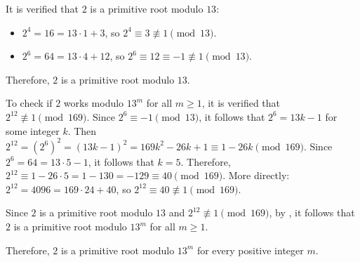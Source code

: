 \begin{enumerate}
\begin{enumerate}
\begin{subanswer}
      It is verified that $2$ is a primitive root modulo $13$:
      \begin{itemize}
        \item $2^4 = 16 = 13 \cdot 1 + 3$, so $2^4 \equiv 3 \not\equiv 1 \pmod{13}$.
        \item $2^6 = 64 = 13 \cdot 4 + 12$, so $2^6 \equiv 12 \equiv -1 \not\equiv 1 \pmod{13}$.
      \end{itemize}
      Therefore, $2$ is a primitive root modulo $13$.
      
      To check if $2$ works modulo $13^m$ for all $m \geq 1$, it is verified that $2^{12} \not\equiv 1 \pmod{169}$.
      Since $2^6 \equiv -1 \pmod{13}$, it follows that $2^6 = 13k - 1$ for some integer $k$.
      Then $2^{12} = (2^6)^2 = (13k - 1)^2 = 169k^2 - 26k + 1 \equiv 1 - 26k \pmod{169}$.
      Since $2^6 = 64 = 13 \cdot 5 - 1$, it follows that $k = 5$.
      Therefore, $2^{12} \equiv 1 - 26 \cdot 5 = 1 - 130 = -129 \equiv 40 \pmod{169}$.
      More directly: $2^{12} = 4096 = 169 \cdot 24 + 40$, so $2^{12} \equiv 40 \not\equiv 1 \pmod{169}$.
      
      Since $2$ is a primitive root modulo $13$ and $2^{12} \not\equiv 1 \pmod{169}$, by , it follows that $2$ is a primitive root modulo $13^m$ for all $m \geq 1$.
      
      Therefore, $2$ is a primitive root modulo $13^m$ for every positive integer $m$.
    \end{subanswer}
  \end{enumerate}










\end{enumerate}
